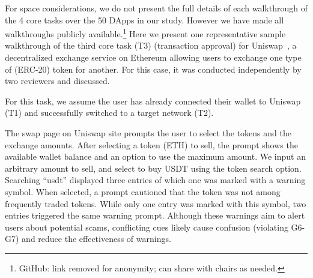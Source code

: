 \documentclass[conference]{IEEEtran}
\begin{document}
For space considerations, we do not present the full details of each walkthrough of the 4 core tasks over the 50 DApps in our study. However we have made all walkthroughs publicly available.\footnote{GitHub: link removed for anonymity; can share with chairs as needed.} Here we present one representative sample walkthrough of the third core task (T3) (transaction approval) for Uniswap~\cite{uniswap}, a decentralized exchange service on Ethereum allowing users to exchange one type of (ERC-20) token for another. For this case, it was conducted independently by two reviewers and discussed.

For this task, we assume the user has already connected their wallet to Uniswap (T1) and successfully switched to a target network (T2). %

The swap page on Uniswap site prompts the user to select the tokens and the exchange amounts.
After selecting a token (ETH) to sell, the prompt shows the available wallet balance and an option to use the maximum amount. We input an arbitrary amount to sell,
and select to buy USDT using the token search option.
Searching ``usdt'' displayed three entries of which one was marked with a warning symbol. When selected, a prompt cautioned that the token was not among frequently traded tokens.
While only one entry was marked with this symbol, two entries triggered the same warning prompt.
Although these warnings aim to alert users about potential scams, conflicting cues likely cause confusion (violating G6-G7) and reduce the effectiveness of warnings.
\end{document}
